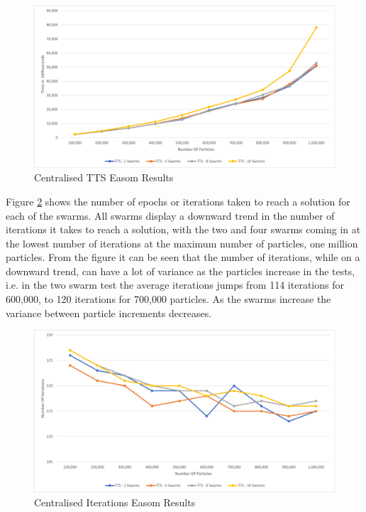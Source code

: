 \documentclass[oneside,12pt]{book}
\begin{document}
\begin{figure}[H]
    \centering
    \includegraphics[scale=0.45]{Images/Graphs/CentralisedEasomTTS.png}
    \caption{Centralised TTS Easom Results}
    \label{fig:Centralised_TTS_Easom_Results}
\end{figure}

Figure \ref{fig:Centralised_Epoc_Easom_Results} shows the number of epochs or iterations taken to reach a solution for each of the swarms. All swarms display a downward trend in the number of iterations it takes to reach a solution, with the two and four swarms coming in at the lowest number of iterations at the maximum number of particles, one million particles. From the figure it can be seen that the number of iterations, while on a downward trend, can have a lot of variance as the particles increase in the tests, i.e. in the two swarm test the average iterations jumps from 114 iterations for 600,000, to 120 iterations for 700,000 particles. As the swarms increase the variance between particle increments decreases. 

\begin{figure}[H]
    \centering
    \includegraphics[scale=0.45]{Images/Graphs/CentralisedEasomEpoch.png}
    \caption{Centralised Iterations Easom Results}
    \label{fig:Centralised_Epoc_Easom_Results}
\end{figure}
\end{document}
